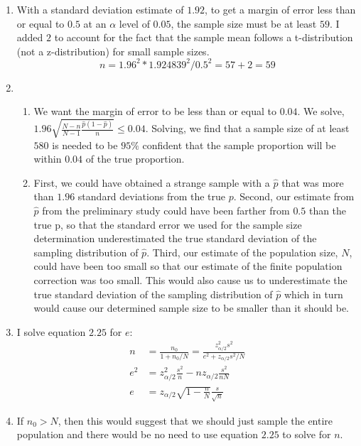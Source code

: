 \documentclass[11pt]{article}
\begin{document}
\begin{doublespace}
\begin{enumerate}
\begin{enumerate}
\end{enumerate}

\item With a standard deviation estimate of $1.92$, to get a margin of error less than or equal to $0.5$ at an $\alpha$ level of $0.05$, the sample size must be at least $59$. I added $2$ to account for the fact that the sample mean follows a t-distribution (not a z-distribution) for small sample sizes.
$$n=1.96^2*1.924839^2/0.5^2=57+2=59$$

\item \begin{enumerate}
\item We want the margin of error to be less than or equal to $0.04$. We solve,
$1.96\sqrt{\frac{N-n}{N-1}\frac{\hat{p}(1-\hat{p})}{n}} \leq 0.04$. Solving, we find that a sample size of at least $580$ is needed to be $95\%$ confident that the sample proportion will be within $0.04$ of the true proportion.

\item First, we could have obtained a strange sample with a $\hat{p}$ that was more than $1.96$ standard deviations from the true $p$. Second, our estimate from $\hat{p}$ from the preliminary study could have been farther from $0.5$ than the true p, so that the standard error we used for the sample size determination underestimated the true standard deviation of the sampling distribution of $\hat{p}$. Third, our estimate of the population size, $N$, could have been too small so that our estimate of the finite population correction was too small. This would also cause us to underestimate the true standard deviation of the sampling distribution of $\hat{p}$ which in turn would cause our determined sample size to be smaller than it should be.
\end{enumerate}

\item I solve equation $2.25$ for $e$:
\begin{align*}
n &= \frac{n_0}{1+n_0/N} = \frac{z_{\alpha/2}^2s^2}{e^2+z_{\alpha/2}s^2/N} \\
e^2 &= z_{\alpha/2}^2\frac{s^2}{n}-nz_{\alpha/2}\frac{s^2}{nN} \\
e &= z_{\alpha/2}\sqrt{1-\frac{n}{N}}\frac{s}{\sqrt{n}}
\end{align*}

\item If $n_0 > N$, then this would suggest that we should just sample the entire population and there would be no need to use equation $2.25$ to solve for $n$.


\end{enumerate}
\end{doublespace}
\end{document}
